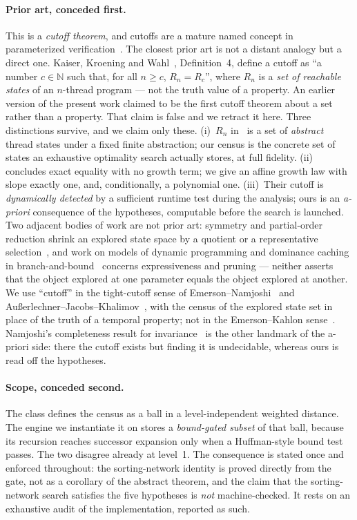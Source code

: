 \documentclass[11pt,a4paper]{article}
\theoremstyle{plain}
\theoremstyle{definition}
\theoremstyle{remark}
\begin{document}
\paragraph{Prior art, conceded first.}
This is a \emph{cutoff theorem}, and cutoffs are a mature named concept in
parameterized verification~\cite{EN95,EK00,Nam07,AJK16,Jaber20,HS20,BN23,BloemEtAl15}.
The closest prior art is not a distant analogy but a direct one.
Kaiser, Kroening and Wahl~\cite{KKW10}, Definition~4, define a cutoff as
``a number $c \in \mathbb{N}$ such that, for all $n \ge c$, $R_n = R_c$'',
where $R_n$ is a \emph{set of reachable states} of an $n$-thread program ---
not the truth value of a property. An earlier version of the present work
claimed to be the first cutoff theorem about a set rather than a property.
That claim is false and we retract it here. Three distinctions survive, and we
claim only these. (i)~$R_n$ in~\cite{KKW10} is a set of \emph{abstract} thread
states under a fixed finite abstraction; our census is the concrete set of
states an exhaustive optimality search actually stores, at full fidelity.
(ii)~\cite{KKW10} concludes exact equality with no growth term; we give an
affine growth law with slope exactly one, and, conditionally, a polynomial
one. (iii)~Their cutoff is \emph{dynamically detected} by a sufficient runtime
test during the analysis; ours is an \emph{a-priori} consequence of the
hypotheses, computable before the search is launched. Two adjacent bodies of
work are not prior art: symmetry and partial-order reduction shrink an explored
state space by a quotient or a representative
selection~\cite{CEFJ96,ID96,Valmari91}, and work on models of dynamic
programming and dominance caching in branch-and-bound~\cite{BODI11,CGS24}
concerns expressiveness and pruning --- neither asserts that the object
explored at one parameter equals the object explored at another. We use
``cutoff'' in the
tight-cutoff sense of Emerson--Namjoshi~\cite{EN95,EN03} and
Au{\ss}erlechner--Jacobs--Khalimov~\cite{AJK16}, with the census of the explored
state set in place of the truth of a temporal property; not in the
Emerson--Kahlon sense~\cite{EK00}. Namjoshi's completeness result for
invariance~\cite{Nam07} is the other landmark of the a-priori side: there the
cutoff exists but finding it is undecidable, whereas ours is read off the
hypotheses.

\paragraph{Scope, conceded second.}
The class defines the census as a ball in a level-independent weighted
distance. The engine we instantiate it on stores a \emph{bound-gated subset} of
that ball, because its recursion reaches successor expansion only when a
Huffman-style bound test passes. The two disagree already at level~1. The
consequence is stated once and enforced throughout: the sorting-network
identity is proved directly from the gate, not as a corollary of the abstract
theorem, and the claim that the sorting-network search satisfies the five
hypotheses is \emph{not} machine-checked. It rests on an exhaustive audit of
the implementation, reported as such.
\end{document}
